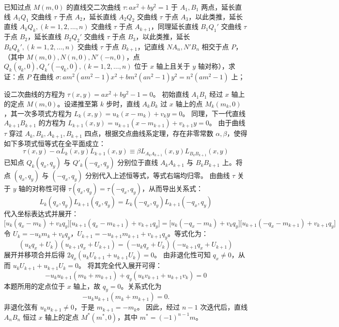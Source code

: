 \begin{example}
已知过点 $M(m,0)$ 的直线交二次曲线 $\tau: ax^2+by^2=1$ 于 $A_1,B_1$ 两点，延长直线 $A_1Q_1$ 交曲线 $\tau$ 于点 $A_2$，延长直线 $A_2Q_2$ 交曲线 $\tau$ 于点 $A_3$，以此类推，延长直线 $A_kQ_k,(k=1,2,\dots,n)$ 交曲线 $\tau$ 于点 $A_{k+1}$，同理延长直线 $B_1Q_1'$ 交曲线 $\tau$ 于点 $B_2$，延长直线 $B_2Q_2'$ 交曲线 $\tau$ 于点 $B_3$，以此类推，延长 $B_kQ_k',(k=1,2,\dots,n)$ 交曲线 $\tau$ 于点 $B_{k+1}$，记直线 $NA_n,N'B_n$ 相交于点 $P$，（其中 $M(m,0),N(n,0),N'(-n,0)$，点 $Q_k(q_k,0),Q_k'(-q_k,0),(k=1,2,\dots,n)$ 位于 $x$ 轴上且关于 $y$ 轴对称），求证：点 $P$ 在曲线 $\sigma: am^2(am^2-1)x^2+bm^2(an^2-1)y^2=n^2(am^2-1)$ 上；
\end{example}
\begin{solution}
设二次曲线的方程为 $\tau(x, y) = a x^2 + b y^2 - 1 = 0$。
初始直线 $A_1 B_1$ 经过 $x$ 轴上的定点 $M(m,0)$。设递推至第 $k$ 步时，直线 $A_k B_k$ 过 $x$ 轴上的点 $M_k(m_k, 0)$，其一次多项式方程为 $L_k(x, y) = u_k(x - m_k) + v_k y = 0$。
同理，下一代直线 $A_{k+1} B_{k+1}$ 的方程为 $L_{k+1}(x, y) = u_{k+1}(x - m_{k+1}) + v_{k+1} y = 0$。
由于曲线 $\tau$ 穿过 $A_k, B_k, A_{k+1}, B_{k+1}$ 四点，根据交点曲线系定理，存在非零常数 $\alpha, \beta$，使得如下多项式恒等式在全平面成立：
$$ \tau(x, y) - \alpha L_k(x, y) L_{k+1}(x, y) \equiv \beta L_{A_k A_{k+1}}(x, y) L_{B_k B_{k+1}}(x, y) $$
已知点 $Q_k(q_x, q_y)$ 与 $Q'_k(-q_x, q_y)$ 分别位于直线 $A_k A_{k+1}$ 与 $B_k B_{k+1}$ 上。将点 $(q_x, q_y)$ 与 $(-q_x, q_y)$ 分别代入上述恒等式，等式右端均归零。
由曲线 $\tau$ 关于 $y$ 轴的对称性可得 $\tau(q_x, q_y) = \tau(-q_x, q_y)$，从而导出关系式：
$$ L_k(q_x, q_y) L_{k+1}(q_x, q_y) = L_k(-q_x, q_y) L_{k+1}(-q_x, q_y) $$
代入坐标表达式并展开：
$$ \big[u_k(q_x - m_k) + v_k q_y\big] \big[u_{k+1}(q_x - m_{k+1}) + v_{k+1} q_y\big] = \big[u_k(-q_x - m_k) + v_k q_y\big] \big[u_{k+1}(-q_x - m_{k+1}) + v_{k+1} q_y\big] $$
令 $U_k = -u_k m_k + v_k q_y$，$U_{k+1} = -u_{k+1} m_{k+1} + v_{k+1} q_y$。等式化为：
$$ (u_k q_x + U_k)(u_{k+1} q_x + U_{k+1}) = (-u_k q_x + U_k)(-u_{k+1} q_x + U_{k+1}) $$
展开并移项合并后得 $2 q_x (u_k U_{k+1} + u_{k+1} U_k) = 0$。
由非退化性可知 $q_x \neq 0$，从而 $u_k U_{k+1} + u_{k+1} U_k = 0$。
将其完全代入展开可得：
$$ -u_k u_{k+1} (m_k + m_{k+1}) + q_y (u_k v_{k+1} + u_{k+1} v_k) = 0 $$
本题所用的定点位于 $x$ 轴上，故 $q_y=0$。关系式化为
\[
-u_k u_{k+1}(m_k+m_{k+1})=0.
\]
非退化弦有 $u_k u_{k+1}\ne0$，于是 $m_{k+1}=-m_k$。
因此，经过 $n-1$ 次迭代后，直线 $A_n B_n$ 恒过 $x$ 轴上的定点 $M^*(m^*, 0)$，其中 $m^* = (-1)^{n-1}m$。


\end{solution}
